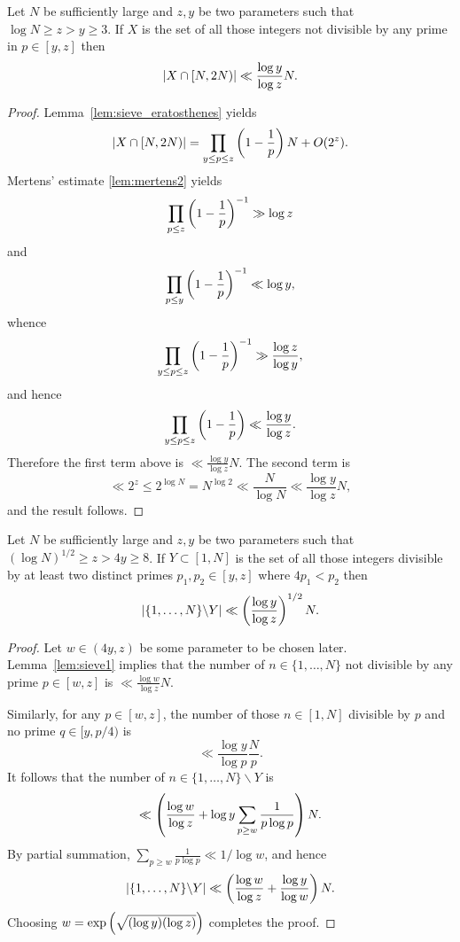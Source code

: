 \begin{lemma}\label{lem:sieve1}
\leanok
{}
Let $N$ be sufficiently large and $z,y$ be two parameters such that $\log N \geq z>y\geq 3$. If $X$ is the set of all those integers not divisible by any prime in $p\in [y,z]$ then
\[\left\lvert  X\cap [N,2N)\right\rvert\ll \frac{\log y}{\log z}N.\]
\end{lemma}
\begin{proof}
  \leanok
  Lemma~\ref{lem:sieve_eratosthenes} yields
  \[\left\lvert X\cap [N,2N)\right\rvert = \prod_{y\leq p\leq z}\left( 1-\frac{1}{p}\right)N+ O(2^z).\]
  Mertens' estimate \ref{lem:mertens2} yields
  \[\prod_{p\leq z}\left( 1-\frac{1}{p}\right)^{-1} \gg \log z\]
  and
  \[\prod_{p\leq y}\left( 1-\frac{1}{p}\right)^{-1} \ll \log y,\]
  whence
  \[\prod_{y\leq p\leq z}\left( 1-\frac{1}{p}\right)^{-1}\gg \frac{\log z}{\log y},\]
  and hence
  \[ \prod_{y\leq p\leq z}\left( 1-\frac{1}{p}\right)\ll \frac{\log y}{\log z}.\]
  Therefore the first term above is $\ll \frac{\log y}{\log z}N$. The second term is
  \[\ll 2^z \leq 2^{\log N}=N^{\log 2}\ll \frac{N}{\log N}\ll \frac{\log y}{\log z}N,\]
  and the result follows.
\end{proof}


\begin{lemma}\label{lem:sieve2}
  \leanok
Let $N$ be sufficiently large and $z,y$ be two parameters such that $(\log N)^{1/2}\geq z>4y\geq 8$. If $Y\subset [1,N]$ is the set of all those integers divisible by at least two distinct primes $p_1,p_2\in [y,z]$ where $4p_1<p_2$ then
\[\left\lvert  \{1,\ldots,N\}\backslash Y\right\rvert\ll \left( \frac{\log y}{\log z}\right)^{1/2}N.\]
\end{lemma}
\begin{proof}
  \leanok
  Let $w\in (4y,z)$ be some parameter to be chosen later. Lemma~\ref{lem:sieve1} implies that the number of $n\in \{1,\ldots,N\}$ not divisible by any prime $p\in [w,z]$ is $\ll \frac{\log w}{\log z}N$.

  Similarly, for any $p\in [w,z]$, the number of those $n\in [1,N]$ divisible by $p$ and no prime  $q\in [y,p/4)$ is
  \[\ll \frac{\log y}{\log p}\frac{N}{p}.\]
  It follows that the number of $n\in\{1,\ldots,N\}\backslash Y$ is
  \[\ll \left( \frac{\log w}{\log z}+ \log y\sum_{p\geq w}\frac{1}{p\log p}\right)N.\]
  By partial summation, $\sum_{p\geq w}\frac{1}{p\log p}\ll 1/\log w$, and hence
  \[\left\lvert  \{1,\ldots,N\}\backslash Y\right\rvert\ll \left( \frac{\log w}{\log z}+\frac{ \log y}{\log w}\right)N.\]
  Choosing $w=\exp\left( \sqrt{(\log y)(\log z)}\right)$ completes the proof.
\end{proof}
